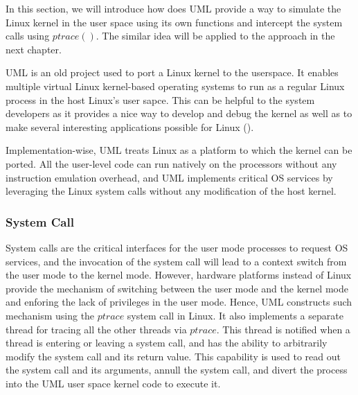 In this section, we will introduce how does UML provide a way to simulate the Linux kernel in the user space using its own functions and intercept the system calls using $ptrace()$. The similar idea will be applied to the approach in the next chapter.

UML is an old project used to port a Linux kernel to the userspace. It enables multiple virtual Linux kernel-based operating systems to run as a regular Linux process in the host Linux's user sapce. This can be helpful to the system developers as it provides a nice way to develop and debug the kernel as well as to make several interesting applications possible for Linux (\cite{JD06}). 


Implementation-wise, UML treats Linux as a platform to which the kernel can be ported. All the user-level code can run natively on the processors without any instruction emulation overhead, and UML implements critical OS services by leveraging the Linux system calls without any modification of the host kernel.  

\subsubsection{System Call}


System calls are the critical interfaces for the user mode processes to request OS services, and the invocation of the system call will lead to a context switch from the user mode to the kernel mode. However, hardware platforms instead of Linux provide the mechanism of switching between the user mode and the kernel mode and enforing the lack of privileges in the user mode. Hence, UML constructs such mechanism using the $ptrace$ system call in Linux. It also implements a separate thread for tracing all the other threads via $ptrace$. This thread is notified when a thread is entering or leaving a system call, and has the ability to arbitrarily modify the system call and its return value. This capability is used to read out the system call and its arguments, annull the system call, and divert the process into the UML user space kernel code to execute it.

